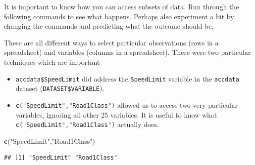 \documentclass[
]{article}
\newenvironment{Shaded}{\begin{snugshade}}{\end{snugshade}}
\newcommand{\DecValTok}[1]{\textcolor[rgb]{0.00,0.00,0.81}{#1}}
\newcommand{\FunctionTok}[1]{\textcolor[rgb]{0.13,0.29,0.53}{\textbf{#1}}}
\newcommand{\NormalTok}[1]{#1}
\newcommand{\SpecialCharTok}[1]{\textcolor[rgb]{0.81,0.36,0.00}{\textbf{#1}}}
\newcommand{\StringTok}[1]{\textcolor[rgb]{0.31,0.60,0.02}{#1}}
\providecommand{\tightlist}{%
  \setlength{\itemsep}{0pt}\setlength{\parskip}{0pt}}
\begin{document}
It is important to know how you can access subsets of data. Run through
the following commands to see what happens. Perhaps also experiment a
bit by changing the commands and predicting what the outcome should be.

\begin{Shaded}
\end{Shaded}

These are all different ways to select particular observations (rows in
a spreadsheet) and variables (columns in a spreadsheet). There were two
particular techniques which are important

\begin{itemize}
\tightlist
\item
  \texttt{accdata\$SpeedLimit} did address the \texttt{SpeedLimit}
  variable in the \texttt{accdata} dataset (\texttt{DATASET\$VARIABLE}).
\item
  \texttt{c("SpeedLimit","Road1Class")} allowed us to access two very
  particular variables, ignoring all other 25 variables. It is useful to
  know what \texttt{c("SpeedLimit","Road1Class")} actually does.
\end{itemize}

\begin{Shaded}
\begin{Highlighting}[]
\FunctionTok{c}\NormalTok{(}\StringTok{"SpeedLimit"}\NormalTok{,}\StringTok{"Road1Class"}\NormalTok{)}
\end{Highlighting}
\end{Shaded}

\begin{verbatim}
## [1] "SpeedLimit" "Road1Class"
\end{verbatim}
\end{document}
